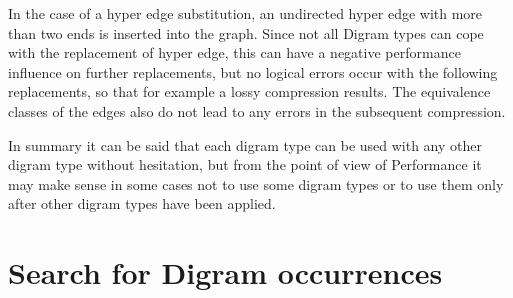 In the case of a hyper edge substitution, an undirected hyper edge with more than two ends is inserted into the graph. Since not all Digram types can cope with the replacement of hyper edge, this can have a negative performance influence on further replacements, but no logical errors occur with the following replacements, so that for example a lossy compression results. The equivalence classes of the edges also do not lead to any errors in the subsequent compression.

In summary it can be said that each digram type can be used with any other digram type without hesitation, but from the point of view of Performance it may make sense in some cases not to use some digram types or to use them only after other digram types have been applied.

\section{Search for Digram occurrences}

